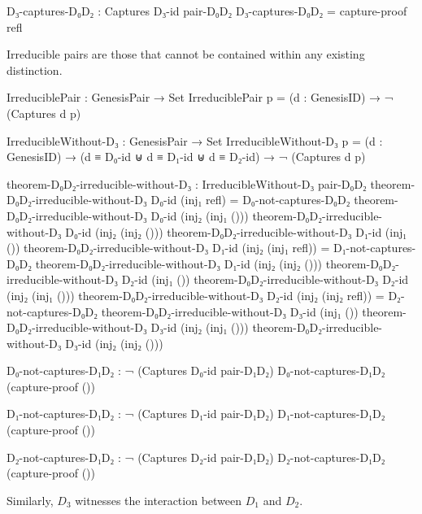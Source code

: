 \documentclass[11pt,a4paper]{book}
\begin{document}
\begin{code}
D₃-captures-D₀D₂ : Captures D₃-id pair-D₀D₂
D₃-captures-D₀D₂ = capture-proof refl

\end{code}

Irreducible pairs are those that cannot be contained within any existing distinction.

\begin{code}
IrreduciblePair : GenesisPair → Set
IrreduciblePair p = (d : GenesisID) → ¬ (Captures d p)

IrreducibleWithout-D₃ : GenesisPair → Set
IrreducibleWithout-D₃ p = (d : GenesisID) → (d ≡ D₀-id ⊎ d ≡ D₁-id ⊎ d ≡ D₂-id) → ¬ (Captures d p)

theorem-D₀D₂-irreducible-without-D₃ : IrreducibleWithout-D₃ pair-D₀D₂
theorem-D₀D₂-irreducible-without-D₃ D₀-id (inj₁ refl) = D₀-not-captures-D₀D₂
theorem-D₀D₂-irreducible-without-D₃ D₀-id (inj₂ (inj₁ ())) 
theorem-D₀D₂-irreducible-without-D₃ D₀-id (inj₂ (inj₂ ()))
theorem-D₀D₂-irreducible-without-D₃ D₁-id (inj₁ ())
theorem-D₀D₂-irreducible-without-D₃ D₁-id (inj₂ (inj₁ refl)) = D₁-not-captures-D₀D₂
theorem-D₀D₂-irreducible-without-D₃ D₁-id (inj₂ (inj₂ ()))
theorem-D₀D₂-irreducible-without-D₃ D₂-id (inj₁ ())
theorem-D₀D₂-irreducible-without-D₃ D₂-id (inj₂ (inj₁ ()))
theorem-D₀D₂-irreducible-without-D₃ D₂-id (inj₂ (inj₂ refl)) = D₂-not-captures-D₀D₂
theorem-D₀D₂-irreducible-without-D₃ D₃-id (inj₁ ())
theorem-D₀D₂-irreducible-without-D₃ D₃-id (inj₂ (inj₁ ()))
theorem-D₀D₂-irreducible-without-D₃ D₃-id (inj₂ (inj₂ ()))
\end{code}

\begin{code}
D₀-not-captures-D₁D₂ : ¬ (Captures D₀-id pair-D₁D₂)
D₀-not-captures-D₁D₂ (capture-proof ())

D₁-not-captures-D₁D₂ : ¬ (Captures D₁-id pair-D₁D₂)
D₁-not-captures-D₁D₂ (capture-proof ())

D₂-not-captures-D₁D₂ : ¬ (Captures D₂-id pair-D₁D₂)
D₂-not-captures-D₁D₂ (capture-proof ())

\end{code}

Similarly, $D_3$ witnesses the interaction between $D_1$ and $D_2$.
\end{document}
